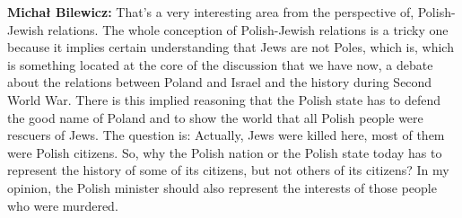 \textbf{Michał Bilewicz:} That's a very interesting area from the perspective of, Polish-Jewish relations. The whole conception of Polish-Jewish relations is a tricky one because it implies certain understanding that Jews are not Poles, which is, which is something located at the core of the discussion that we have now, a debate about the relations between Poland and Israel and the history during Second World War. There is this implied reasoning that the Polish state has to defend the good name of Poland and to show the world that all Polish people were rescuers of Jews. The question is: Actually, Jews were killed here, most of them were Polish citizens. So, why the Polish nation or the Polish state today has to represent the history of some of its citizens, but not others of its citizens? In my opinion, the Polish minister should also represent the interests of those people who were murdered.\\
